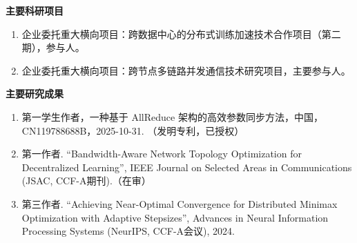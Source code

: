 \cleardoublepage
{}

\noindent\quad\textbf{主要科研项目}

\begin{enumerate}[label=\arabic*., leftmargin=2.2em, itemsep=0.5ex]
  \item 企业委托重大横向项目：跨数据中心的分布式训练加速技术合作项目（第二期），参与人。
  
  \item 企业委托重大横向项目：跨节点多链路并发通信技术研究项目，主要参与人。
  
\end{enumerate}

\noindent\quad\textbf{主要研究成果}

\begin{enumerate}[label=\arabic*., leftmargin=2.2em, itemsep=0.5ex]
  \item 第一学生作者，一种基于 AllReduce 架构的高效参数同步方法，中国，CN119788688B，2025-10-31.
  （发明专利，已授权）
  
  

  \item 第一作者. ``Bandwidth-Aware Network Topology Optimization for Decentralized Learning'', IEEE Journal on Selected Areas in Communications (JSAC, CCF-A期刊).（在审）
  
  \item 第三作者. ``Achieving Near-Optimal Convergence for Distributed Minimax Optimization with Adaptive Stepsizes'', Advances in Neural Information Processing Systems (NeurIPS, CCF-A会议), 2024.
\end{enumerate}